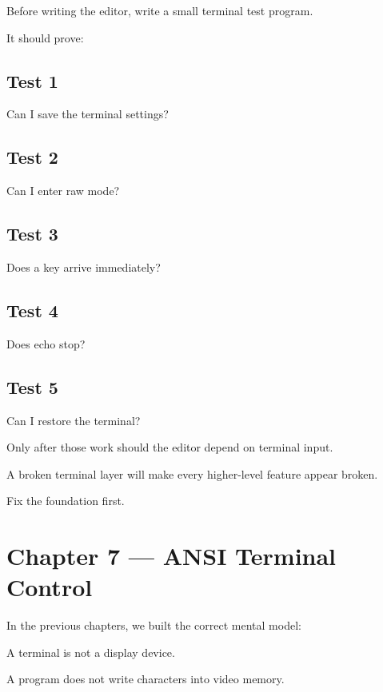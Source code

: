 \documentclass[
  oneside,
  openany]{book}
\begin{document}
Before writing the editor, write a small terminal test program.

It should prove:

\hypertarget{test-1}{%
\section{Test 1}\label{test-1}}

Can I save the terminal settings?

\hypertarget{test-2}{%
\section{Test 2}\label{test-2}}

Can I enter raw mode?

\hypertarget{test-3}{%
\section{Test 3}\label{test-3}}

Does a key arrive immediately?

\hypertarget{test-4}{%
\section{Test 4}\label{test-4}}

Does echo stop?

\hypertarget{test-5}{%
\section{Test 5}\label{test-5}}

Can I restore the terminal?

Only after those work should the editor depend on terminal input.

A broken terminal layer will make every higher-level feature appear
broken.

Fix the foundation first.

\hypertarget{chapter-7-ansi-terminal-control}{%
\chapter{Chapter 7 --- ANSI Terminal
Control}\label{chapter-7-ansi-terminal-control}}

In the previous chapters, we built the correct mental model:

A terminal is not a display device.

A program does not write characters into video memory.
\end{document}
